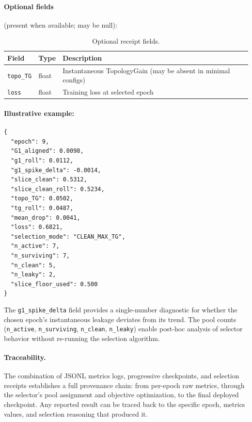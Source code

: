 \paragraph{Optional fields} (present when available; may be null):

\begin{table}
\caption{Optional receipt fields.}
\begin{ruledtabular}
\begin{tabular}{lll}
Field & Type & Description \\
\hline
\texttt{topo\_TG} & float & Instantaneous TopologyGain (may be absent in minimal configs) \\
\texttt{loss} & float & Training loss at selected epoch \\
\end{tabular}
\end{ruledtabular}
\end{table}

\paragraph{Illustrative example:}

\begin{lstlisting}
{
  "epoch": 9,
  "G1_aligned": 0.0098,
  "g1_roll": 0.0112,
  "g1_spike_delta": -0.0014,
  "slice_clean": 0.5312,
  "slice_clean_roll": 0.5234,
  "topo_TG": 0.0502,
  "tg_roll": 0.0487,
  "mean_drop": 0.0041,
  "loss": 0.6821,
  "selection_mode": "CLEAN_MAX_TG",
  "n_active": 7,
  "n_surviving": 7,
  "n_clean": 5,
  "n_leaky": 2,
  "slice_floor_used": 0.500
}
\end{lstlisting}

The \texttt{g1\_spike\_delta} field provides a single-number diagnostic for whether the chosen epoch's instantaneous leakage deviates from its trend. The pool counts (\texttt{n\_active}, \texttt{n\_surviving}, \texttt{n\_clean}, \texttt{n\_leaky}) enable post-hoc analysis of selector behavior without re-running the selection algorithm.

\paragraph{Traceability.} The combination of JSONL metrics logs, progressive checkpoints, and selection receipts establishes a full provenance chain: from per-epoch raw metrics, through the selector's pool assignment and objective optimization, to the final deployed checkpoint. Any reported result can be traced back to the specific epoch, metrics values, and selection reasoning that produced it.
\twocolumngrid

